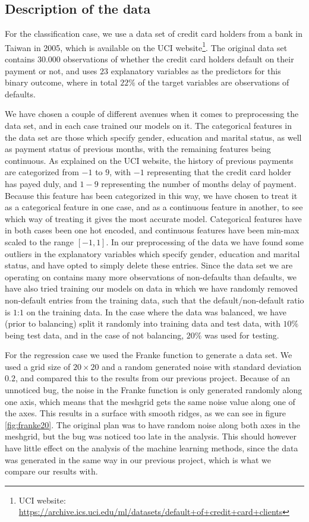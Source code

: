 \subsection{Description of the data}
For the classification case, we use a data set of credit card holders from a bank in Taiwan in 2005, which is available on the UCI website\footnote{UCI website: \href{https://archive.ics.uci.edu/ml/datasets/default+of+credit+card+clients}{https://archive.ics.uci.edu/ml/datasets/default+of+credit+card+clients}}. The original data set contains $30.000$ observations of whether the credit card holders default on their payment or not, and uses $23$ explanatory variables as the predictors for this binary outcome, where in total $22\%$ of the target variables are observations of defaults. 

We have chosen a couple of different avenues when it comes to preprocessing the data set, and in each case trained our models on it. The categorical features in the data set are those which specify gender, education and marital status, as well as payment status of previous months, with the remaining features being continuous. As explained on the UCI website, the history of previous payments are categorized from $-1$ to $9$, with $-1$ representing that the credit card holder has payed duly, and $1-9$ representing the number of months delay of payment. Because this feature has been categorized in this way, we have chosen to treat it as a categorical feature in one case, and as a continuous feature in another, to see which way of treating it gives the most accurate model. Categorical features have in both cases been one hot encoded, and continuous features have been min-max scaled to the range $[-1, 1]$. In our preprocessing of the data we have found some outliers in the explanatory variables which specify gender, education and marital status, and have opted to simply delete these entries. 
Since the data set we are operating on contains many more observations of non-defaults than defaults, we have also tried training our models on data in which we have randomly removed non-default entries from the training data, such that the default/non-default ratio is $1$:$1$ on the training data. 
In the case where the data was balanced, we have (prior to balancing) split it randomly into training data and test data, with $10\%$ being test data, and in the case of not balancing, $20\%$ was used for testing.

For the regression case we used the Franke function\cite{franke} to generate a data set. We used a grid size of $20\times20$ and a random generated noise with standard deviation $0.2$, and compared this to the results from our previous project\cite{project1}. Because of an unnoticed bug, the noise in the Franke function is only generated randomly along one axis, which means that the meshgrid gets the same noise value along one of the axes. This  results in a surface with smooth ridges, as we can see in figure \ref{fig:franke20}. The original plan was to have random noise along both axes in the meshgrid, but the bug was noticed too late in the analysis. This should however have little effect on the analysis of the machine learning methods, since the data was generated in the same way in our previous project, which is what we compare our results with.

